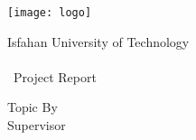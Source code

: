 \thispagestyle{empty}
\begin{center}
	\begin{latin}
		\texttt{[image: logo]} \\
		\begin{Large}
		Isfahan University of Technology \\
		\enDep \\ [1cm]
		\enlevel\ Project Report \\ [2mm]
		\enmajor
		\end{Large}
		\vskip 3cm
		\large{Topic}
		\vskip 0.4cm
	    \textbf{\huge{\entitle}}
		\vskip 2cm
		\large{By}         \\ \Large{\enAuthor}
		\vskip 2cm
		\large{Supervisor} \\ \Large{\ensupervisor}
		\vskip 2cm
		\large{\engdate}
	\end{latin}
\end{center}

